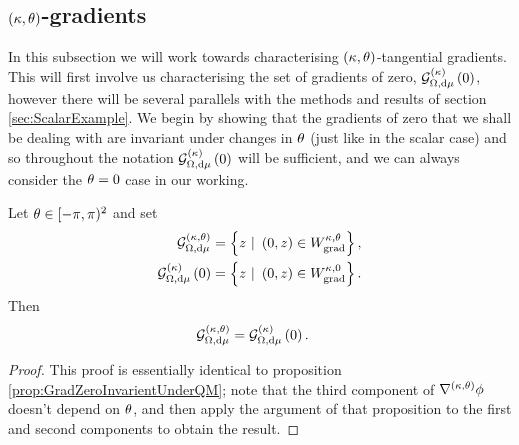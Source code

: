\subsection{$\left( \kappa, \theta \right)$-gradients} \label{sec:ktGradients}
In this subsection we will work towards characterising $\left( \kappa,\theta \right)$-tangential gradients.
This will first involve us characterising the set of gradients of zero, $\mathcal{G}_{ \Omega, \mathrm{d}\mu}^{(\kappa)}\left( 0 \right)$, however there will be several parallels with the methods and results of section \ref{sec:ScalarExample}. 
We begin by showing that the gradients of zero that we shall be dealing with are invariant under changes in $\theta$ (just like in the scalar case) and so throughout the notation $\mathcal{G}_{ \Omega, \mathrm{d}\mu}^{(\kappa)}\left( 0 \right)$ will be sufficient, and we can always consider the $\theta=0$ case in our working.
\begin{prop} \label{prop:kGradZeroInvarientUnderQM}
	Let $\theta\in[-\pi,\pi)^2$ and set 
	\begin{align*}
		\mathcal{G}^{\kt}_{\ddom, \mathrm{d}\ddmes} &= \clbracs{ z \ \vert \ \bracs{0,z}\in W^{\wavenumber, \qm}_{\mathrm{grad}}}, \\
		\kgradZero{\ddom}{\ddmes} &= \clbracs{ z \ \vert \ \bracs{0,z}\in W^{\wavenumber, 0}_{\mathrm{grad}}}.
	\end{align*}
	Then
	\begin{align*}
		\mathcal{G}^{\left( \kappa, \theta \right)}_{\Omega, \mathrm{d}\mu} &= \mathcal{G}_{ \Omega, \mathrm{d}\mu}^{(\kappa)}\left( 0 \right).
	\end{align*}
\end{prop}
\begin{proof}
	This proof is essentially identical to proposition \ref{prop:GradZeroInvarientUnderQM}; note that the third component of $\nabla^{\left( \kappa, \theta \right)}\phi$ doesn't depend on $\theta$, and then apply the argument of that proposition to the first and second components to obtain the result.
\end{proof}

